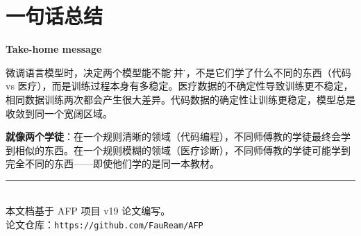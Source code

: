 \documentclass[12pt,a4paper]{article}
\begin{document}
\section{一句话总结}

\begin{keybox}
\textbf{Take-home message}

微调语言模型时，决定两个模型能不能\"合并\"的，不是它们学了什么不同的东西（代码 vs 医疗），而是训练过程本身有多稳定。医疗数据的不确定性导致训练更不稳定，相同数据训练两次都会产生很大差异。代码数据的确定性让训练更稳定，模型总是收敛到同一个宽阔区域。

\textbf{就像两个学徒}：在一个规则清晰的领域（代码编程），不同师傅教的学徒最终会学到相似的东西。在一个规则模糊的领域（医疗诊断），不同师傅教的学徒可能学到完全不同的东西——即使他们学的是同一本教材。
\end{keybox}

\vspace{1cm}
\begin{center}
\rule{0.5\textwidth}{0.5pt}\\[6pt]
{\small 本文档基于 AFP 项目 v19 论文编写。}\\
{\small 论文仓库：\texttt{https://github.com/FauReam/AFP}}
\end{center}
\end{document}

